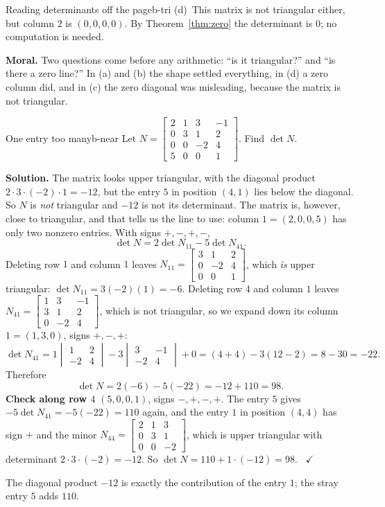 \documentclass[11pt]{article}
\begin{document}
\begin{exmp}{Reading determinants off the page}{b-tri}
(d)~This matrix is not triangular either, but column $2$ is $(0,0,0,0)$. By Theorem~\ref{thm:zero} the determinant is $0$; no computation is needed.

\textbf{Moral.} Two questions come before any arithmetic: ``is it triangular?'' and ``is there a zero line?'' In (a) and (b) the shape settled everything, in (d) a zero column did, and in (c) the zero diagonal was misleading, because the matrix is not triangular.
\end{exmp}

\begin{exmp}{One entry too many}{b-near}
Let $N=\begin{bmatrix}2&1&3&-1\\0&3&1&2\\0&0&-2&4\\5&0&0&1\end{bmatrix}$. Find $\det N$.

\textbf{Solution.} The matrix looks upper triangular, with the diagonal product $2\cdot3\cdot(-2)\cdot1=-12$, but the entry $5$ in position $(4,1)$ lies below the diagonal. So $N$ is \emph{not} triangular and $-12$ is not its determinant. The matrix is, however, close to triangular, and that tells us the line to use: column $1=(2,0,0,5)$ has only two nonzero entries. With signs $+,-,+,-$,
\[
\det N=2\det N_{11}-5\det N_{41}.
\]
Deleting row $1$ and column $1$ leaves $N_{11}=\begin{bmatrix}3&1&2\\0&-2&4\\0&0&1\end{bmatrix}$, which \emph{is} upper triangular: $\det N_{11}=3(-2)(1)=-6$. Deleting row $4$ and column $1$ leaves $N_{41}=\begin{bmatrix}1&3&-1\\3&1&2\\0&-2&4\end{bmatrix}$, which is not triangular, so we expand down its column $1=(1,3,0)$, signs $+,-,+$:
\[
\det N_{41}=1\begin{vmatrix}1&2\\-2&4\end{vmatrix}-3\begin{vmatrix}3&-1\\-2&4\end{vmatrix}+0=(4+4)-3(12-2)=8-30=-22.
\]
Therefore
\[
\det N=2(-6)-5(-22)=-12+110=98.
\]
\textbf{Check along row $4$} $(5,0,0,1)$, signs $-,+,-,+$. The entry $5$ gives $-5\det N_{41}=-5(-22)=110$ again, and the entry $1$ in position $(4,4)$ has sign $+$ and the minor $N_{44}=\begin{bmatrix}2&1&3\\0&3&1\\0&0&-2\end{bmatrix}$, which is upper triangular with determinant $2\cdot3\cdot(-2)=-12$. So $\det N=110+1\cdot(-12)=98$. \ $\checkmark$

The diagonal product $-12$ is exactly the contribution of the entry $1$; the stray entry $5$ adds $110$.
\end{exmp}
\end{document}
